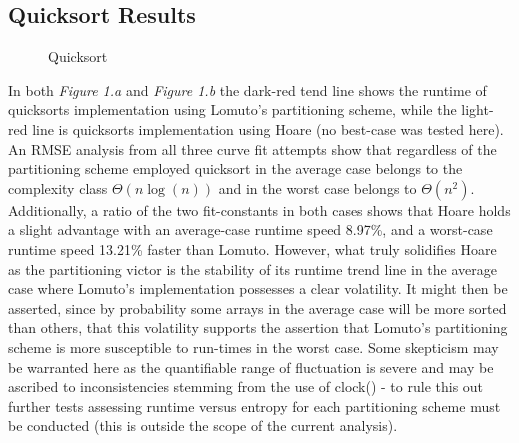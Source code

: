 \documentclass[11pt,letterpaper]{report}
\begin{document}
\subsection*{Quicksort Results}
\begin{figure}[h]
  \centering
  \hfill
  \caption{Quicksort}
\end{figure}

In both \emph{Figure 1.a} and \emph{Figure 1.b} the dark-red tend line shows the runtime of quicksorts implementation using Lomuto's partitioning scheme, while the light-red line is quicksorts implementation using Hoare (no best-case was tested here). An RMSE analysis from all three curve fit attempts show that regardless of the partitioning scheme employed quicksort in the average case belongs to the complexity class $\Theta (n \log{}(n))$ and in the worst case belongs to $\Theta(n^2)$. Additionally, a ratio of the two fit-constants in both cases shows that Hoare holds a slight advantage with an average-case runtime speed 8.97\%, and a worst-case runtime speed 13.21\% faster than Lomuto. However, what truly solidifies Hoare as the partitioning victor is the stability of its runtime trend line in the average case where Lomuto's implementation possesses a clear volatility. It might then be asserted, since by probability some arrays in the average case will be more sorted than others, that this volatility supports the assertion that Lomuto's partitioning scheme is more susceptible to run-times in the worst case. Some skepticism may be warranted here as the quantifiable range of fluctuation is severe and may be ascribed to inconsistencies stemming from the use of clock() - to rule this out further tests assessing runtime versus entropy for each partitioning scheme must be conducted (this is outside the scope of the current analysis).
\end{document}
